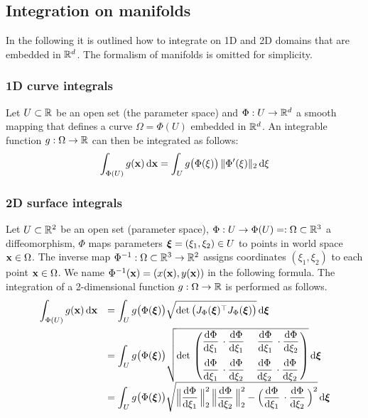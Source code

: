 \subsection{Integration on manifolds}
In the following it is outlined how to integrate on 1D and 2D domains that are embedded in $\mathbb{R}^d$. The formalism of manifolds is omitted for simplicity.

\subsubsection{1D curve integrals}
Let $U\subset \mathbb{R}$ be an open set (the parameter space) and $\Phi:U \to \mathbb{R}^d$ a smooth mapping that defines a curve $\Omega=\Phi(U)$ embedded in $\mathbb{R}^d$. An integrable function $g:\Omega \to \mathbb{R}$ can then be integrated as follows:
%
\begin{equation}\label{eq:integration_transformation_1d}
  \begin{array}{ll}
    \ds\int_{\Phi(U)} g(\bfx) \,\d\bfx = \int_{U} g\big(\Phi(\xi)\big)\,\Vert \Phi'(\xi)\Vert_2 \, \d \xi
  \end{array}
\end{equation}


\subsubsection{2D surface integrals}
Let $U \subset \mathbb{R}^2$ be an open set (parameter space), $\Phi:U \to \Phi(U)=:\Omega \subset\mathbb{R}^3$ a diffeomorphism, $\Phi$ maps parameters $\boldsymbol{\xi}=(\xi_1,\xi_2) \in U$ to points in world space $\textbf{x} \in \Omega$. The inverse map $\Phi^{-1} : \Omega \subset \mathbb{R}^3 \to \mathbb{R}^2$ assigns coordinates $(\xi_1,\xi_2)$ to each point $\textbf{x}\in\Omega$. We name $\Phi^{-1}(\textbf{x}) = (x(\textbf{x}),y(\textbf{x}))$ in the following formula. The integration of a 2-dimensional function $g:\Omega \to \mathbb{R}$ is performed as follows.
%
\begin{equation}\label{eq:integration_transformation_2d}
  \begin{array}{ll}
    \ds\int_{\Phi(U)} g(\bfx) \,\d\bfx  
    &  = \ds\int_{U} g\big(\Phi(\bfxi)\big) 
    \sqrt{\det \big(J_{\Phi}(\bfxi)^\top J_{\Phi}(\bfxi)\big)}\,\d\bfxi\\[4mm]
    
    & = \ds\int_{U} g\big(\Phi(\bfxi)\big) 
    \sqrt{\det\mat{\d{\Phi}{\xi_1} \cdot \d{\Phi}{\xi_1} & \d{\Phi}{\xi_1} \cdot \d{\Phi}{\xi_2}  \\[4mm]
    \d{\Phi}{\xi_1} \cdot \d{\Phi}{\xi_2} & \d{\Phi}{\xi_2} \cdot \d{\Phi}{\xi_2}}}\,\d\bfxi\\[4mm]
    
     & = \ds\int_{U} g\big(\Phi(\bfxi)\big) 
    \sqrt{\Big\Vert \d{\Phi}{\xi_1}\Big\Vert_2^2\,\Big\Vert \d{\Phi}{\xi_2}\Big\Vert_2^2 - \Big(\d{\Phi}{\xi_1} \cdot \d{\Phi}{\xi_2}\Big)^2 }\,\d\bfxi\\[4mm]
    
    
  \end{array}
\end{equation}

